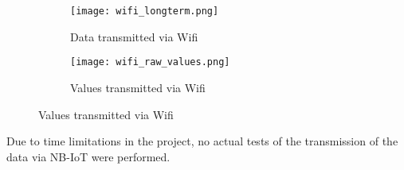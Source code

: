 \begin{figure}[H]
\centering
	\begin{subfigure}[b]{0.4\textwidth}
    \texttt{[image: wifi\_longterm.png]}
    \caption{Data transmitted via Wifi}
    \label{fig:wifi_longterm}
	\end{subfigure}
	\begin{subfigure}[b]{0.4\textwidth}
    \texttt{[image: wifi\_raw\_values.png]}
    \caption{Values transmitted via Wifi}
    \label{fig:wifi_raw_values}
	\end{subfigure}
\end{figure}

Due to time limitations in the project, no actual tests of the transmission of the data via NB-IoT were performed.
